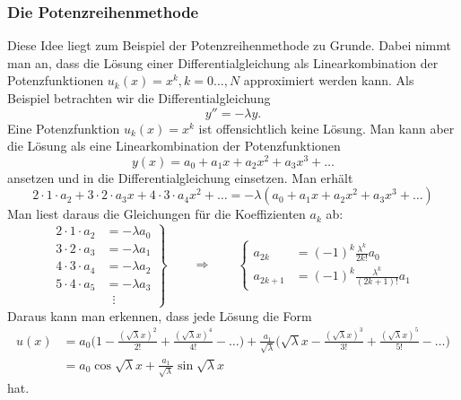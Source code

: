 \subsubsection{Die Potenzreihenmethode}
Diese Idee liegt zum Beispiel der Potenzreihenmethode zu Grunde.
Dabei nimmt man an, dass die Lösung einer Differentialgleichung als
Linearkombination der Potenzfunktionen $u_k(x)=x^k, k=0\dots,N$
approximiert werden kann.
Als Beispiel betrachten wir die Differentialgleichung
\[
y''=-\lambda y.
\]
Eine Potenzfunktion $u_k(x)=x^k$ ist offensichtlich keine Lösung.
Man kann aber die Lösung als eine Linearkombination
der Potenzfunktionen
\[
y(x)
=
a_0+a_1x+a_2x^2+a_3x^3+\dots
\]
ansetzen und in die Differentialgleichung einsetzen.
Man erhält
\[
2\cdot 1 \cdot a_2
+
3\cdot 2 \cdot a_3x
+
4\cdot 3 \cdot a_4x^2
+
\dots
=
-\lambda(
a_0+a_1x+a_2x^2+a_3x^3+\dots)
\]
Man liest daraus die Gleichungen für die Koeffizienten $a_k$ ab:
\begin{equation*}
\left.
\begin{aligned}
2\cdot 1\cdot a_2&=-\lambda a_0\\
3\cdot 2\cdot a_3&=-\lambda a_1\\
4\cdot 3\cdot a_4&=-\lambda a_2\\
5\cdot 4\cdot a_5&=-\lambda a_3\\
&\;\;\vdots
\end{aligned}
\right\}
\qquad\Rightarrow\qquad
\left\{
\begin{aligned}
a_{2k}  &=(-1)^k\frac{\lambda^k}{ 2k!   }a_0\\
a_{2k+1}&=(-1)^k\frac{\lambda^k}{(2k+1)!}a_1
\end{aligned}
\right.
\end{equation*}
Daraus kann man erkennen, dass jede Lösung die Form
\begin{align*}
u(x)
&=
a_0
\biggl(
1-\frac{(\sqrt{\lambda}x)^2}{2!} + \frac{(\sqrt{\lambda}x)^4}{4!}-\dots
\biggr)
+
\frac{a_1}{\sqrt{\lambda}}
\biggl(
\sqrt{\lambda}x
-
\frac{(\sqrt{\lambda}x)^3}{3!} + \frac{(\sqrt{\lambda}x)^5}{5!}-\dots
\biggr)
\\
&= a_0 \cos \sqrt{\lambda}x
+ \frac{a_1}{\sqrt{\lambda}} \sin\sqrt{\lambda}x
\end{align*}
hat.

